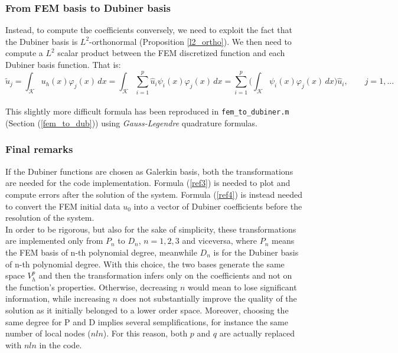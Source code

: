 \documentclass[a4paper,11pt]{article}
\begin{document}
	\subsubsection{From FEM basis to Dubiner basis}
	\noindent Instead, to compute the coefficients conversely, we need to exploit the fact that the Dubiner basis is $L^2$-orthonormal (Proposition \ref{l2_ortho}). We then need to compute a $L^2$ scalar product between the FEM discretized function and each Dubiner basis function. That is:
	\begin{equation}\label{ref4}
	\tilde{u}_j = \int_\mathcal{K} u_h(x) \varphi_j(x) \,dx = \int_{\mathcal{K}} \sum_{i=1}^p \hat{u}_i\psi_i(x) \varphi_j(x) \,dx = \sum_{i=1}^p \Big(\int_{\mathcal{K}}\psi_i(x)\varphi_j(x)\,dx \Big) \hat{u}_i, \qquad j=1,...
	\end{equation}
	\vspace{2mm} \\
	\noindent This slightly more difficult formula has been reproduced in \texttt{fem\_to\_dubiner.m} (Section (\ref{fem_to_dub})) using \emph{Gauss-Legendre} quadrature formulas.
	\subsubsection{Final remarks}\label{dub}
	\noindent If the Dubiner functions are chosen as Galerkin basis, both the transformations are needed for the code implementation. Formula (\ref{ref3}) is needed to plot and compute errors after the solution of the system. Formula (\ref{ref4}) is instead needed to convert the FEM initial data $u_0$ into a vector of Dubiner coefficients before the resolution of the system.\\
	
	\noindent In order to be rigorous, but also for the sake of simplicity, these transformations are implemented only from $P_n$ to $D_n$, $n=1,2,3$ and viceversa, where $P_n$ means the FEM basis of n-th polynomial degree, meanwhile $D_n$ is for the Dubiner basis of n-th polynomial degree. With this choice, the two bases generate the same space $V_h^p$ and then the transformation infers only on the coefficients and not on the function's properties. Otherwise, decreasing $n$ would mean to lose significant information, while increasing $n$ does not substantially improve the quality of the solution as it initially belonged to a lower order space. Moreover, choosing the same degree for P and D implies several semplifications, for instance the same number of local nodes ($nln$). For this reason, both $p$ and $q$ are actually replaced with $nln$ in the code.
	
\end{document}
